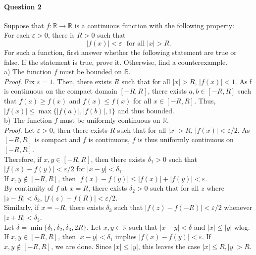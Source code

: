 \documentclass{article}
\begin{document}
\paragraph{Question 2} Suppose that $f: \mathbb{R} \to \mathbb{R}$ is a continuous function with the following property: \\
For each $\varepsilon > 0$, there is $R > 0$ such that 
$$ |f(x)| < \varepsilon \ \ \ \text{for all $|x| > R$}.$$
For such a function, first answer whether the following statement are true or false. If the statement is true, prove it. Otherwise, find a counterexample. \\
\linebreak
a) The function $f$ must be bounded on $\mathbb{R}$. \\
\linebreak
\textit{Proof.} Fix $\varepsilon = 1$. Then, there exists $R$ such that for all $|x| > R$, $|f(x)| < 1$. As f is continuous on the compact domain $[-R, R]$, there exists $a, b \in [-R, R]$ such that $f(a) \geq f(x)$ and $f(x) \leq f(x)$ for all $x \in [-R, R]$. Thus, $|f(x)| \leq \max\{|f(a)|, |f(b)|, 1\}$ and thus bounded. \\
\linebreak
b) The function $f$ must be uniformly continuous on $\mathbb{R}$. \\
\linebreak
\textit{Proof.} Let $\varepsilon > 0$, then there exists $R$ such that for all $|x| > R$, $|f(x)| < \varepsilon/2$. As $[-R, R]$ is compact and $f$ is continuous, $f$ is thus uniformly continuous on $[-R, R]$. \\
\linebreak
Therefore, if $x, y \in [-R, R]$, then there exists $\delta_1 > 0$ such that $|f(x) - f(y)| < \varepsilon/2$ for $|x-y|<\delta_1$. \\
If $x, y \not\in[-R, R]$, then $|f(x) - f(y)| \leq 
|f(x)| + |f(y)| < \varepsilon$. \\
By continuity of $f$ at $x=R$, there exists $\delta_2 > 0$ such that for all $z$ where $|z - R| < \delta_2$, $|f(z) - f(R)| < \varepsilon / 2$. \\
Similarly, if $x = -R$, there exists $\delta_3$ such that $|f(z) - f(-R)| < \varepsilon / 2$ whenever $|z + R| < \delta_3$. \\
\linebreak
Let $\delta = \min\{\delta_1, \delta_2, \delta_3, 2R\}$. Let $x,y\in\mathbb{R}$ such that $|x-y|<\delta$ and $|x|\leq |y|$ wlog. If $x,y\in [-R,R]$, then $|x-y|<\delta_1$ implies $|f(x)-f(y)|<\varepsilon$. If $x,y\notin [-R,R]$, we are done. Since $|x|\leq |y|$, this leaves the case $|x|\leq R, |y|>R$. 
\end{document}
